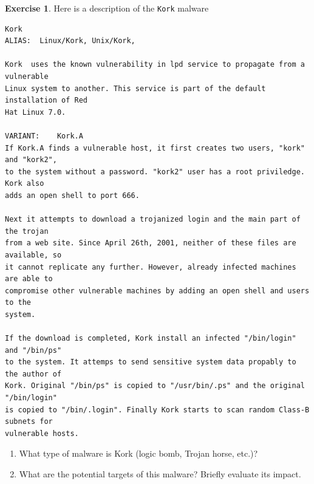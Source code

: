 \documentclass[a4paper,11pt]{article}
\theoremstyle{plain}
\theoremstyle{definition}
\newtheorem{exercice}{Exercise}
\begin{document}


\begin{exercice}
Here is a description of the \texttt{Kork} malware
\begin{verbatim}
Kork
ALIAS:	Linux/Kork, Unix/Kork,

Kork  uses the known vulnerability in lpd service to propagate from a vulnerable
Linux system to another. This service is part of the default installation of Red
Hat Linux 7.0.

VARIANT:	Kork.A
If Kork.A finds a vulnerable host, it first creates two users, "kork" and "kork2",
to the system without a password. "kork2" user has a root priviledge. Kork also
adds an open shell to port 666.

Next it attempts to download a trojanized login and the main part of the trojan
from a web site. Since April 26th, 2001, neither of these files are available, so
it cannot replicate any further. However, already infected machines are able to
compromise other vulnerable machines by adding an open shell and users to the
system.

If the download is completed, Kork install an infected "/bin/login" and "/bin/ps"
to the system. It attemps to send sensitive system data propably to the author of
Kork. Original "/bin/ps" is copied to "/usr/bin/.ps" and the original "/bin/login"
is copied to "/bin/.login". Finally Kork starts to scan random Class-B subnets for
vulnerable hosts.
\end{verbatim}

\begin{enumerate}
\item What type of malware is Kork (logic bomb, Trojan horse, etc.)?
\item What are the potential targets of this malware? Briefly evaluate its impact.
\end{enumerate}
\end{exercice}
\end{document}
